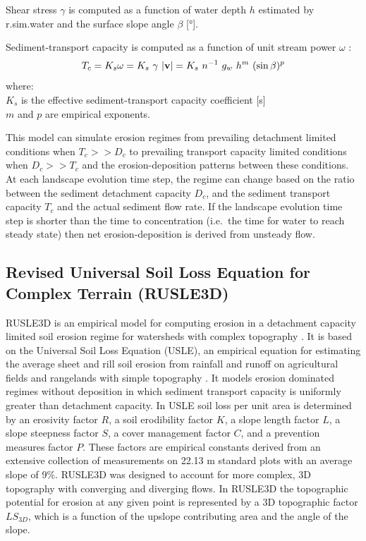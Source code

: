 \documentclass[gmd, manuscript]{copernicus}
\begin{document}
\noindent
Shear stress $\gamma $ is computed
as a function of water depth $h$ estimated by r.sim.water
and the surface slope angle $\beta$ [$\unit{\degree}$].

Sediment-transport capacity is computed as a function 
of unit stream power $\omega$ \citep{Moore1986}:
\smallskip
\begin{equation}
\label{eq:tc_streampower}
T_c =K_s \omega = K_s~\gamma~|{\bf v}| =
K_s~n^{-1}~g_w~h^m~(\sin \beta)^p
\end{equation}
{\small
\noindent
where: \\
\noindent
\hspace*{0.5em} $K_s$ is the effective sediment-transport capacity coefficient [s] \\
\hspace*{0.5em} $m$ and $p$ are empirical exponents.
}


This model can simulate erosion regimes 
from prevailing detachment limited conditions when $T_c >> D_c$ 
to prevailing transport capacity limited conditions when $D_c >> T_c$
and the erosion-deposition patterns between these conditions.
At each landscape evolution time step, the regime can change based on 
the ratio between the sediment detachment capacity $D_c$,
and the sediment transport capacity $T_c$ and the actual sediment flow rate.
If the landscape evolution time step is shorter than the time to concentration 
(i.e.~the time for water to reach steady state)
then net erosion-deposition is derived from unsteady flow.

\subsection{Revised Universal Soil Loss Equation for Complex Terrain (RUSLE3D)}
\label{rusle_model}
RUSLE3D
is an empirical model for computing erosion 
in a detachment capacity limited soil erosion regime
for watersheds with complex topography \citep{Mitasova1996}. 
It is based on 
the Universal Soil Loss Equation (USLE),
an empirical equation for estimating the average
sheet and rill soil erosion from rainfall and runoff
on agricultural fields and rangelands with simple topography 
\citep{Wischmeier1978}. 
It models erosion dominated regimes without deposition
in which sediment transport capacity is 
uniformly greater than detachment capacity.
In USLE soil loss per unit area is determined by 
an erosivity factor $R$,
a soil erodibility factor $K$, 
a slope length factor $L$,
a slope steepness factor $S$,
a cover management factor $C$,
and a prevention measures factor $P$.
These factors are empirical constants derived 
from an extensive collection of measurements 
on 22.13 \unit{m} standard plots with an average slope of 9$\%$.  
RUSLE3D was designed to account for more complex, 3D topography 
with converging and diverging flows. 
In RUSLE3D the topographic potential for erosion at any given point 
is represented by a 3D topographic factor $LS_{3D}$,
which is a function of the upslope contributing area 
and the angle of the slope. 
\end{document}
